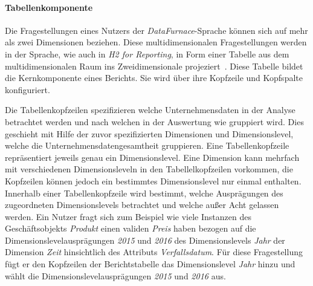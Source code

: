 \documentclass[
  language=german, %
  type=bachelor%
]{isthesis}
\begin{document}
\begin{content}
  \paragraph{Tabellenkomponente}\label{paragraph:tabellenkomponente} 
  Die Fragestellungen eines Nutzers der \textit{DataFurnace}-Sprache können
  sich auf mehr als zwei Dimensionen beziehen. Diese multidimensionalen
  Fragestellungen werden in der Sprache, wie auch in \textit{H2 for Reporting},
  in Form einer Tabelle aus dem multidimensionalen Raum ins Zweidimensionale
  projeziert~\cite[][S.  23]{becker2007h2}. Diese Tabelle bildet die
  Kernkomponente eines Berichts.  Sie wird über ihre Kopfzeile und Kopfspalte
  konfiguriert.

  Die Tabellenkopfzeilen spezifizieren welche Unternehmensdaten in der Analyse
  betrachtet werden und nach welchen in der Auswertung wie gruppiert wird. Dies
  geschieht mit Hilfe der zuvor spezifizierten Dimensionen und Dimensionslevel,
  welche die Unternehmensdatengesamtheit gruppieren. Eine Tabellenkopfzeile
  repräsentiert jeweils genau ein Dimensionslevel. Eine Dimension kann mehrfach
  mit verschiedenen Dimensionsleveln in den Tabellelkopfzeilen vorkommen, die
  Kopfzeilen können jedoch ein bestimmtes Dimensionslevel nur einmal enthalten.
  Innerhalb einer Tabellenkopfzeile wird bestimmt, welche Ausprägungen des
  zugeordneten Dimensionslevels betrachtet und welche außer Acht gelassen
  werden. Ein Nutzer fragt sich zum Beispiel wie viele Instanzen des
  Geschäftsobjekts \textit{Produkt} einen validen \textit{Preis} haben bezogen
  auf die Dimensionslevelausprägungen \textit{2015} und \textit{2016} des
  Dimensionslevels \textit{Jahr} der Dimension \textit{Zeit} hinsichtlich des
  Attributs \textit{Verfallsdatum}. Für diese Fragestellung fügt er den
  Kopfzeilen der Berichtstabelle das Dimensionslevel \textit{Jahr} hinzu und
  wählt die Dimensionslevelausprägungen \textit{2015} und \textit{2016} aus.


\end{content}
\end{document}
